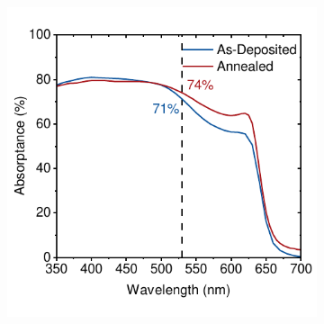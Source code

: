 \begin{figure}[htbp]
\begin{subfigure}[t]{0.45\textwidth}
        \includegraphics[width=\textwidth]{chapters/material_properties/images/Absorptance.pdf} %
        \caption{}
        \label{fig:ch2:absorptance}
    \end{subfigure}

    \vspace{1em} %


\end{figure}
